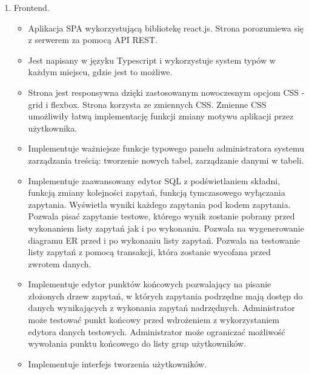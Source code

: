 \begin{enumerate}
    \item Frontend.

    \begin{itemize}

        \item Aplikacja SPA wykorzystującą bibliotekę react.js. Strona
        porozumiewa się z serwerem za pomocą API REST.
        
        \item Jest napisany w języku Typescript i wykorzystuje system typów w
        każdym miejscu, gdzie jest to możliwe.

        \item Strona jest responsywna dzięki zastosowanym nowoczesnym opcjom CSS
        - grid i flexbox. Strona korzysta ze zmiennych CSS. Zmienne CSS
        umożliwiły łatwą implementację funkcji zmiany motywu aplikacji przez
        użytkownika.

        \item Implementuje ważniejsze funkcje typowego panelu administratora
        systemu zarządzania treścią: tworzenie nowych tabel, zarządzanie danymi
        w tabeli.

        \item Implementuje zaawansowany edytor SQL z podświetlaniem składni,
        funkcją zmiany kolejności zapytań, funkcją tymczasowego wyłączania
        zapytania. Wyświetla wyniki każdego zapytania pod kodem zapytania.
        Pozwala pisać zapytanie testowe, którego wynik zostanie pobrany przed
        wykonaniem listy zapytań jak i po wykonaniu. Pozwala na wygenerowanie
        diagramu ER przed i po wykonaniu listy zapytań. Pozwala na testowanie
        listy zapytań z pomocą transakcji, która zostanie wycofana przed zwrotem
        danych.

        \item Implementuje edytor punktów końcowych pozwalający na pisanie
        złożonych drzew zapytań, w których zapytania podrzędne mają dostęp do
        danych wynikających z wykonania zapytań nadrzędnych. Administrator może
        testować punkt końcowy przed wdrożeniem z wykorzystaniem edytora danych
        testowych. Administrator może ograniczać możliwość wywołania punktu
        końcowego do listy grup użytkowników.

        \item Implementuje interfejs tworzenia użytkowników.

    \end{itemize}


\end{enumerate}
